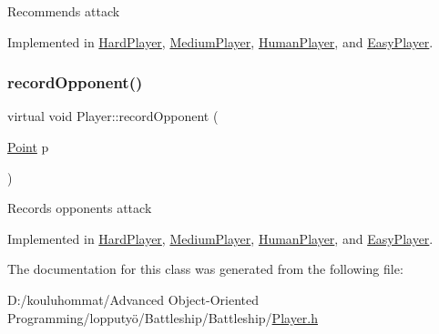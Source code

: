 Recommends attack 

Implemented in \mbox{\hyperlink{class_hard_player_ae1d21325a648a88f1bf51f2b0b286190}{Hard\+Player}}, \mbox{\hyperlink{class_medium_player_a2e99d57f30f3f7f929840b8cda16527d}{Medium\+Player}}, \mbox{\hyperlink{class_human_player_a718f16f3ddeeb34c9f2e93cf1d805b46}{Human\+Player}}, and \mbox{\hyperlink{class_easy_player_a9b00f4a9acc74ff688c609bc15bdbb4d}{Easy\+Player}}.

\mbox{\label{class_player_a768e14edee61e208e6fd295cdd72a49c}} 
\subsubsection{\texorpdfstring{record\+Opponent()}{recordOpponent()}}
{\footnotesize\ttfamily virtual void Player\+::record\+Opponent (\begin{DoxyParamCaption}\item[{\mbox{\hyperlink{class_point}{Point}}}]{p }\end{DoxyParamCaption})\hspace{0.3cm}{\ttfamily [pure virtual]}}

Records opponent\textquotesingle{}s attack 

Implemented in \mbox{\hyperlink{class_hard_player_a986175fb966099ac5fe39950e18799ae}{Hard\+Player}}, \mbox{\hyperlink{class_medium_player_a6183d4a8fe3d68419afcfa9e33cd5928}{Medium\+Player}}, \mbox{\hyperlink{class_human_player_a16b18f42e02d7c8d1f0971ce5e91595f}{Human\+Player}}, and \mbox{\hyperlink{class_easy_player_a2121149ace67b4a67a5dfa7633738ea3}{Easy\+Player}}.



The documentation for this class was generated from the following file\+:\begin{DoxyCompactItemize}
\item 
D\+:/kouluhommat/\+Advanced Object-\/\+Oriented Programming/lopputyö/\+Battleship/\+Battleship/\mbox{\hyperlink{_player_8h}{Player.\+h}}\end{DoxyCompactItemize}
